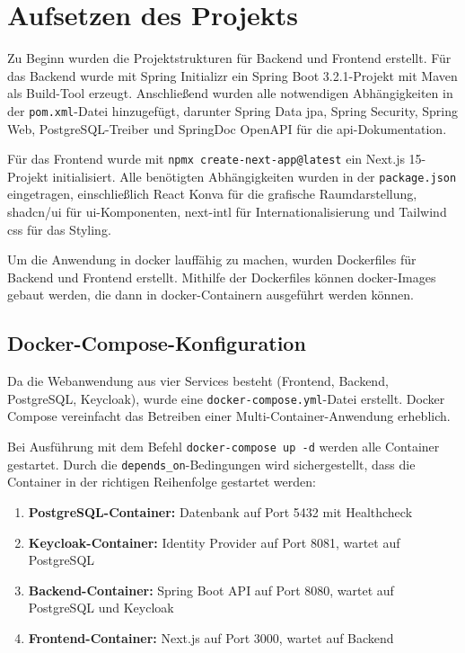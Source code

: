 \documentclass[11pt,a4paper]{report}
\begin{document}
\section{Aufsetzen des Projekts}

Zu Beginn wurden die Projektstrukturen für Backend und Frontend erstellt. Für das Backend wurde mit Spring Initializr ein Spring Boot 3.2.1-Projekt mit Maven als Build-Tool erzeugt. Anschließend wurden alle notwendigen Abhängigkeiten in der \texttt{pom.xml}-Datei hinzugefügt, darunter Spring Data \gls{jpa}, Spring Security, Spring Web, PostgreSQL-Treiber und SpringDoc OpenAPI für die \gls{api}-Dokumentation.

Für das Frontend wurde mit \texttt{\gls{npm}x create-next-app@latest} ein Next.js 15-Projekt initialisiert. Alle benötigten Abhängigkeiten wurden in der \texttt{package.json} eingetragen, einschließlich React Konva für die grafische Raumdarstellung, shadcn/ui für \gls{ui}-Komponenten, next-intl für Internationalisierung und Tailwind \gls{css} für das Styling.

Um die Anwendung in \gls{docker} lauffähig zu machen, wurden Dockerfiles für Backend und Frontend erstellt. Mithilfe der Dockerfiles können \gls{docker}-Images gebaut werden, die dann in \gls{docker}-Containern ausgeführt werden können.

\subsection{Docker-Compose-Konfiguration}

Da die Webanwendung aus vier Services besteht (Frontend, Backend, PostgreSQL, Keycloak), wurde eine \texttt{docker-compose.yml}-Datei erstellt. Docker Compose vereinfacht das Betreiben einer Multi-Container-Anwendung erheblich.

Bei Ausführung mit dem Befehl \texttt{docker-compose up -d} werden alle Container gestartet. Durch die \texttt{depends\_on}-Bedingungen wird sichergestellt, dass die Container in der richtigen Reihenfolge gestartet werden:

\begin{enumerate}
    \item \textbf{PostgreSQL-Container:} Datenbank auf Port 5432 mit Healthcheck
    \item \textbf{Keycloak-Container:} Identity Provider auf Port 8081, wartet auf PostgreSQL
    \item \textbf{Backend-Container:} Spring Boot API auf Port 8080, wartet auf PostgreSQL und Keycloak
    \item \textbf{Frontend-Container:} Next.js auf Port 3000, wartet auf Backend
\end{enumerate}
\end{document}
